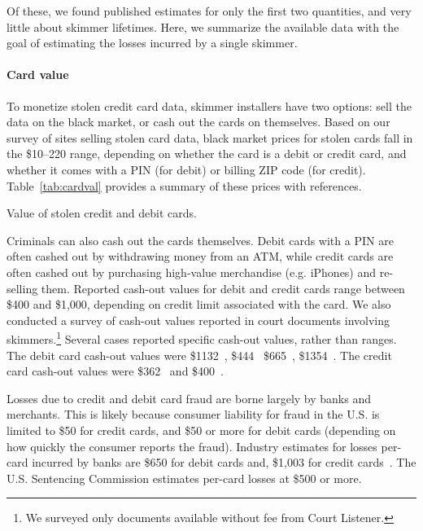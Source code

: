 Of these, we found published estimates for only the first two quantities, and very little about skimmer lifetimes. Here, we summarize the available data with the goal of estimating the losses incurred by a single skimmer.

\paragraph{Card value} To monetize stolen credit card data, skimmer installers have two options: sell the data on the black market, or cash out the cards on themselves. Based on our survey of sites selling stolen card data, black market prices for stolen cards fall in the \$10--220 range, depending on whether the card is a debit or credit card, and whether it comes with a PIN (for debit) or billing ZIP code (for credit). Table~\ref{tab:cardval} provides a summary of these prices with references. 

\begin{table}

\caption{Value of stolen credit and debit cards.}
\label{tab:cardval}
\end{table}

Criminals can also cash out the cards themselves. Debit cards with a PIN are often cashed out by withdrawing money from an ATM, while credit cards are often cashed out by purchasing high-value merchandise (e.g. iPhones) and re-selling them. Reported cash-out values for debit and credit cards range between \$400 and \$1,000, depending on credit limit associated with the card.
%
We also conducted a survey of cash-out values reported in court documents involving skimmers.\footnote{We surveyed only documents available without fee from Court Listener.} Several cases reported specific cash-out values, rather than ranges. The debit card cash-out values were \$1132~\cite{hristov}, \$444~\cite{cristea} \$665~\cite{alisuretove}, \$1354~\cite{mekhakian}. The credit card cash-out values were \$362~\cite{aqel} and \$400~\cite{estrada}.

Losses due to credit and debit card fraud are borne largely by banks and merchants. This is likely because consumer liability for fraud in the U.S. is limited to \$50 for credit cards, and \$50 or more for debit cards (depending on how quickly the consumer reports the fraud).  Industry estimates for losses per-card incurred by banks are \$650 for debit cards and, \$1,003 for credit cards~\cite{arizonareport,ATMIA}. The U.S. Sentencing Commission estimates per-card losses at \$500 or more.

